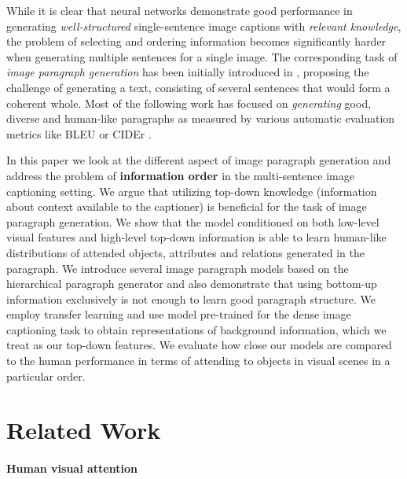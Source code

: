 \documentclass[11pt,a4paper]{article}
\begin{document}
While it is clear that neural networks demonstrate good performance in generating \textit{well-structured} single-sentence image captions with \textit{relevant knowledge}, the problem of selecting and ordering information becomes significantly harder when generating multiple sentences for a single image. The corresponding task of
\textit{image paragraph generation} has been initially introduced in , proposing the challenge of generating a text, consisting of several sentences that would form a coherent whole.
Most of the following work \cite{liang2017recurrent,chatterjee2018diverse,wang2019convolutional} has focused on \textit{generating} good, diverse and human-like paragraphs as measured by various automatic evaluation metrics like BLEU \cite{bleu} or CIDEr \cite{vedantam2014cider}.

In this paper we look at the different aspect of image paragraph generation and address the problem of \textbf{information order} in the multi-sentence image captioning setting.
We argue that utilizing top-down knowledge (information about context available to the captioner) is beneficial for the task of image paragraph generation.
We show that the model conditioned on both low-level visual features and high-level top-down information is able to learn human-like distributions of attended objects, attributes and relations generated in the paragraph.
We introduce several image paragraph models based on the hierarchical paragraph generator  and also
demonstrate that using bottom-up information exclusively is not enough to learn good paragraph structure.
We employ transfer learning and use model pre-trained for the dense image captioning task \cite{densecap} to obtain representations of background information, which we treat as our top-down features.
We evaluate how close our models are compared to the human performance in terms of attending to objects in visual scenes in a particular order.


\section{Related Work}

\paragraph{Human visual attention}
\end{document}

